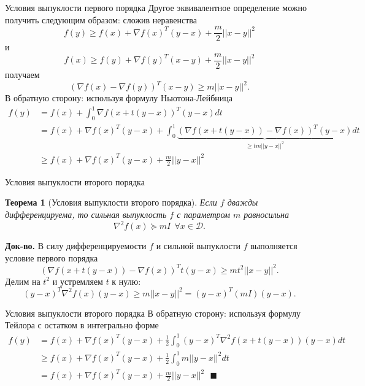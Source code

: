 \documentclass[10pt, handout]{beamer}
\newtheorem{theorem_ru}{Теорема}[]
\begin{document}
\begin{frame}{Условия выпуклости первого порядка}
Другое эквивалентное определение можно получить следующим образом: сложив неравенства
$$
f(y)\geq f(x)+\nabla f(x)^T(y-x)+\frac{m}{2}||x-y||^2
$$
и
$$
f(x)\geq f(y)+\nabla f(y)^T(x-y)+\frac{m}{2}||x-y||^2
$$
получаем
$$
(\nabla f(x)-\nabla f(y))^T(x - y)\geq m||x-y||^2.
$$
\pause
В обратную сторону: используя формулу Ньютона-Лейбница
\begin{align*}
f(y)&=f(x)+\int_0^1\nabla f(x + t(y-x))^T(y-x)dt\\
&=f(x)+\nabla f(x)^T(y-x) + \int_0^1\underbrace{(\nabla f(x + t(y-x))-\nabla f(x))^T(y-x)}_{\geq tm||y-x||^2}dt\\
&\geq f(x)+ \nabla f(x)^T(y-x) + \frac{m}{2}||y-x||^2
\end{align*}

\end{frame}

\begin{frame}{Условия выпуклости второго порядка}
\begin{theorem_ru}[Условия выпуклости второго порядка]
Если $f$ дважды дифференцируема, то сильная выпуклость $f$ с параметром $m$ равносильна
$$
\nabla^2 f(x)\succeq mI~~\forall x\in \mathcal{D}.
$$
\end{theorem_ru}
\pause
\textbf{Док-во.} В силу дифференцируемости $f$ и сильной выпуклости $f$ выполняется условие первого порядка
$$
(\nabla f(x+t(y-x))-\nabla f(x))^Tt(y - x)\geq mt^2||x-y||^2.
$$
\pause
Делим на $t^2$ и устремляем $t$ к нулю:
$$
(y-x)^T\nabla^2 f(x)(y-x)\geq m||x-y||^2=(y-x)^T(mI)(y-x).
$$
\end{frame}

\begin{frame}{Условия выпуклости второго порядка}
В обратную сторону: используя формулу Тейлора с остатком в интегрально форме
\begin{align*}
f(y)&=f(x)+\nabla f(x)^T(y-x) + \frac{1}{2}\int_0^1(y-x)^T\nabla^2f(x+t(y-x))(y-x)dt\\
&\geq f(x)+\nabla f(x)^T(y-x) + \frac{1}{2}\int_0^1 m||y-x||^2dt \\
&= f(x)+\nabla f(x)^T(y-x) + \frac{m}{2}||y-x||^2~~~\blacksquare
\end{align*}
\end{frame}
\end{document}
